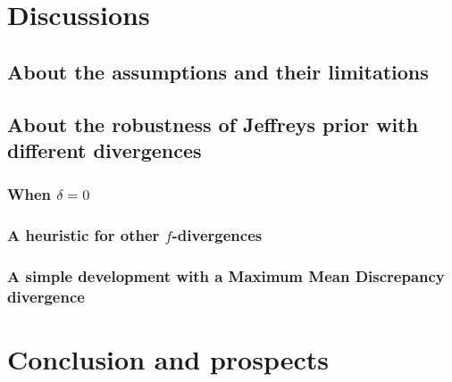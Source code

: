 \section{Discussions}

    \subsection{About the assumptions and their limitations}


    \subsection{About the robustness of Jeffreys prior with different divergences}


        \subsubsection{When $\delta=0$}

        \subsubsection{A heuristic for other $f$-divergences}

        \subsubsection{A simple development with a Maximum Mean Discrepancy divergence}

\section{Conclusion and prospects}













